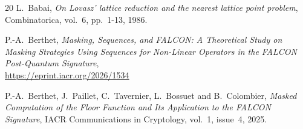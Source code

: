 \documentclass{llncs}
\begin{document}
\begin{thebibliography}{20}
L.~Babai,
\emph{On Lovasz’ lattice reduction and the nearest lattice point problem},
Combinatorica, vol.~6, pp.~1-13, 1986.








P.-A.~Berthet,
\emph{Masking, Sequences, and FALCON: A Theoretical Study on Masking
Strategies Using Sequences for Non-Linear Operators in the FALCON
Post-Quantum Signature},\\
\url{https://eprint.iacr.org/2026/1534}

P.-A.~Berthet, J.~Paillet, C.~Tavernier, L.~Bossuet and B.~Colombier,
\emph{Masked Computation of the Floor Function and Its Application to
the FALCON Signature},
IACR Communications in Cryptology, vol.~1, issue~4, 2025.


\end{thebibliography}
\end{document}
